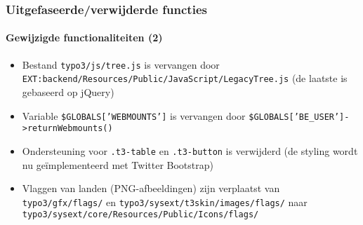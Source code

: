 \begin{frame}[fragile]
	\frametitle{Uitgefaseerde/verwijderde functies}
	\framesubtitle{Gewijzigde functionaliteiten (2)}

	\begin{itemize}

		\item Bestand
			\small\texttt{typo3/js/tree.js}\normalsize\space
			is vervangen door
			\small\texttt{EXT:backend/Resources/Public/JavaScript/LegacyTree.js}\normalsize\newline
			(de laatste is gebaseerd op jQuery)

		\item Variable
			\small\texttt{\$GLOBALS['WEBMOUNTS']}\normalsize\space
			is vervangen door
			\small\texttt{\$GLOBALS['BE\_USER']->returnWebmounts()}\normalsize

		\item Ondersteuning voor
			\small\texttt{.t3-table}\normalsize\space
			en
			\small\texttt{.t3-button}\normalsize\space
			is verwijderd\newline
			\small
				(de styling wordt nu geïmplementeerd met Twitter Bootstrap)
			\normalsize

		\item Vlaggen van landen (PNG-afbeeldingen) zijn verplaatst van
			\small\texttt{typo3/gfx/flags/}\normalsize
			en
			\small\texttt{typo3/sysext/t3skin/images/flags/}\normalsize\newline
			naar \small\texttt{typo3/sysext/core/Resources/Public/Icons/flags/}\normalsize

	\end{itemize}

\end{frame}



